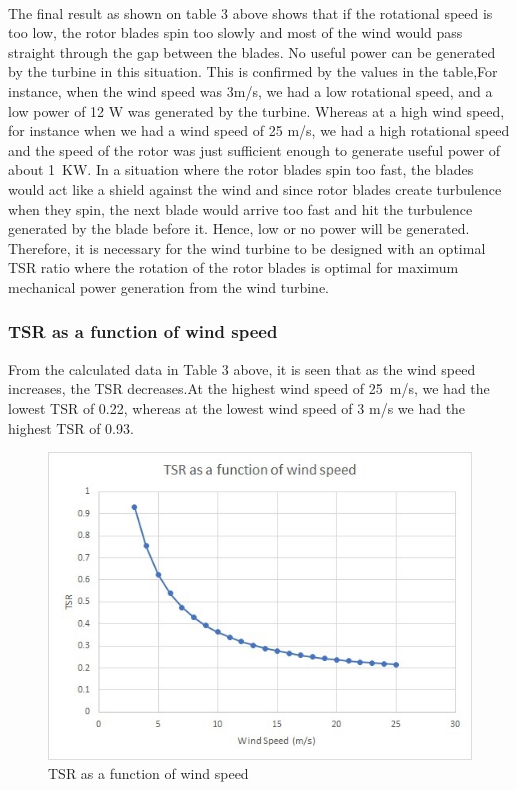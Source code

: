 \documentclass[titlepage]{article}
\begin{document}
\paragraph{} The final result as shown on table 3 above shows that if the rotational speed is too low, the rotor blades spin too slowly and most of the wind would pass straight through the gap between the blades. No useful power can be generated by the turbine in this situation. This is confirmed by the values in the table,For instance,  when the wind speed was 3m/s, we had a low rotational speed, and a low power of 12 W was generated by the turbine. Whereas at a high wind speed, for instance when we had a wind speed of 25 m/s, we had a high rotational speed and the speed of the rotor was just sufficient enough to generate useful power of about 1~KW. In a situation where the rotor blades spin too fast, the blades would  act like a shield against the wind and since rotor blades create turbulence when they spin, the next blade would arrive too fast and hit the turbulence generated by the blade before it. Hence, low or no power will be generated. Therefore, it is necessary for the wind turbine to be designed with an optimal TSR ratio where the rotation of the rotor blades is optimal for maximum mechanical power generation from the wind turbine.

\subsubsection{TSR as a function of wind speed}
From the calculated data in Table 3 above, it is seen that as the wind speed increases, the TSR decreases.At the highest wind speed of 25~m/s, we had the lowest TSR of 0.22, whereas at the lowest wind speed of 3 m/s we had the highest TSR of 0.93.
\begin{figure}[h!]
\centering
\includegraphics[scale=0.8]{TSR.jpg}
\caption{TSR as a function of wind speed}
\label{TSR}
\end{figure}
\end{document}
